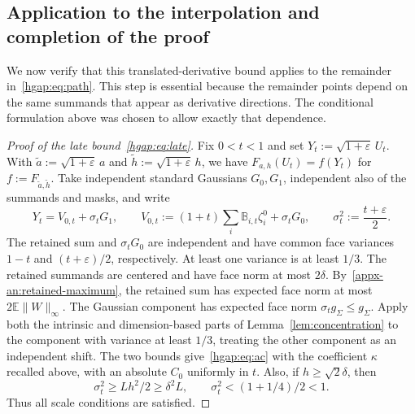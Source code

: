 \documentclass[11pt,letterpaper]{article}
\theoremstyle{remark}
\newcommand{\E}{\mathbb E}
\begin{document}
\subsection{Application to the interpolation and completion of the proof}
\label{hgap:sec:completion}

We now verify that this translated-derivative bound applies to the
remainder in~\eqref{hgap:eq:path}. This step is essential because the
remainder points depend on the same summands that appear as derivative
directions. The conditional formulation above was chosen to allow
exactly that dependence.

\begin{proof}[Proof of the late bound~\eqref{hgap:eq:late}]
Fix $0<t<1$ and set $Y_t:=\sqrt{1+\varepsilon}\,U_t$. With
$\widetilde a:=\sqrt{1+\varepsilon}\,a$ and
$\widetilde h:=\sqrt{1+\varepsilon}\,h$, we have
$F_{a,h}(U_t)=f(Y_t)$ for $f:=F_{\widetilde a,\widetilde h}$.
Take independent standard Gaussians $G_0,G_1$, independent also of
the summands and masks, and write
\begin{equation}\label{hgap:eq:split}
 Y_t=V_{0,t}+\sigma_tG_1,\qquad
 V_{0,t}:=(1+t)\sum_i\mathbb B_{i,t}\zeta_i^0+\sigma_tG_0,
 \qquad \sigma_t^2:=\frac{t+\varepsilon}{2}.
\end{equation}
The retained sum and $\sigma_tG_0$ are independent and have common
face variances $1-t$ and $(t+\varepsilon)/2$, respectively. At least one
variance is at least $1/3$. The retained summands are centered and
have face norm at most $2\delta$. By~\eqref{appx-an:retained-maximum},
the retained sum has expected face norm at most $2\E\|W\|_\infty$.
The Gaussian component has expected face norm $\sigma_tg_\Sigma\le g_\Sigma$.
Apply both the intrinsic and dimension-based parts of
Lemma~\ref{lem:concentration} to the component with variance at least
$1/3$, treating the other component as an independent shift. The two
bounds give~\eqref{hgap:eq:ac} with the coefficient $\kappa$ recalled
above, with an absolute $C_0$ uniformly in $t$. Also, if $h\ge\sqrt2\delta$, then
\[
 \sigma_t^2\ge Lh^2/2\ge\delta^2L,
 \qquad \sigma_t^2<(1+1/4)/2<1.
\]
Thus all scale conditions are satisfied.


\end{proof}
\end{document}
